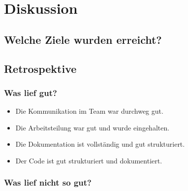 \section{Diskussion}
\subsection{Welche Ziele wurden erreicht?}
\subsection{Retrospektive}
\subsubsection{Was lief gut?}
\begin{itemize}
    \item Die Kommunikation im Team war durchweg gut.
    \item Die Arbeitsteilung war gut und wurde eingehalten.
    \item Die Dokumentation ist vollständig und gut strukturiert.
    \item Der Code ist gut strukturiert und dokumentiert.
\end{itemize}
\subsubsection{Was lief nicht so gut?}